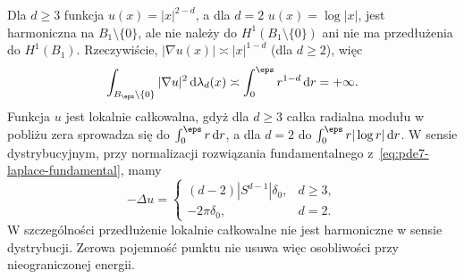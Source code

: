 \begin{kontrprzyklad}
\label{ex:pde19-fundamental}
Dla $d\ge3$ funkcja $u(x)=|x|^{2-d}$, a dla $d=2$
$u(x)=\log|x|$, jest harmoniczna na $B_1\setminus\{0\}$,
ale nie należy do $H^1(B_1\setminus\{0\})$ ani nie
ma przedłużenia do $H^1(B_1)$. Rzeczywiście,
$|\nabla u(x)|\asymp|x|^{1-d}$ (dla $d\ge2$), więc
\[
 \int_{B_\eps\setminus\{0\}}|\nabla u|^2
 \,\mathrm d\lambda_d(x)
 \asymp\int_0^\eps r^{1-d}\,\mathrm dr=+\infty.
\]
Funkcja $u$ jest lokalnie całkowalna, gdyż dla $d\ge3$
całka radialna modułu w pobliżu zera sprowadza się
do $\int_0^\eps r\,\mathrm dr$, a dla $d=2$
do $\int_0^\eps r|\log r|\,\mathrm dr$.
W sensie dystrybucyjnym, przy normalizacji rozwiązania
fundamentalnego z~\eqref{eq:pde7-laplace-fundamental}, mamy
\[
 -\Delta u=
 \begin{cases}
 (d-2)|S^{d-1}|\delta_0,&d\ge3,\\
 -2\pi\delta_0,&d=2.
 \end{cases}
\]
W szczególności przedłużenie lokalnie całkowalne
nie jest harmoniczne w sensie dystrybucji. Zerowa pojemność punktu nie
usuwa więc osobliwości przy nieograniczonej energii.
\end{kontrprzyklad}

